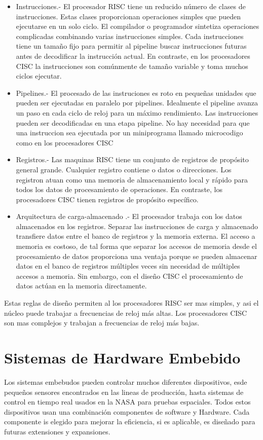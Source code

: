 \documentclass[12pt]{book}
\theoremstyle{definition}
\theoremstyle{remark}
\theoremstyle{plain}
\begin{document}
\begin{itemize}
\item Instrucciones.- El procesador RISC tiene un reducido número de clases de instrucciones. Estas clases proporcionan operaciones simples que pueden ejecutarse en un solo ciclo. El compilador o programador sintetiza operaciones complicadas combinando varias instrucciones simples. Cada instrucciones tiene un tamaño fijo para permitir al pipeline buscar instrucciones futuras antes de decodificar la instrucción actual. En contraste, en los procesadores CISC la instrucciones son comúnmente de tamaño variable y toma muchos ciclos ejecutar.
\item Pipelines.- El procesado de las instruciones es roto en pequeñas unidades que pueden ser ejecutadas en paralelo por pipelines. Idealmente el pipeline avanza un paso en cada ciclo de reloj para un máximo rendimiento. Las instrucciones pueden ser decodificadas en una etapa pipeline. No hay necesidad para que una instruccion sea ejecutada por un miniprograma llamado microcodigo como en los procesadores CISC
\item Registros.- Las maquinas RISC tiene un conjunto de registros de propósito general grande. Cualquier registro contiene o datos o direcciones. Los registron atuan como una memoria de almacenamiento local y rápido para todos los datos de procesamiento de operaciones. En contraste, los procesadores CISC tienen registros de propósito específico.
\item Arquitectura de carga-almacenado .- El procesador trabaja con los datos almacenados en los registros. Separar las instrucciones de carga y almacenado transfiere datos entre el banco de registros y la memoria externa. El acceso a memoria es costoso, de tal forma que separar los accesos de memoria desde el procesamiento de datos proporciona una ventaja porque se pueden almacenar datos en el banco de registros múltiples veces sin necesidad de múltiples accesos a memoria. Sin embargo, con el diseño CISC el procesamiento de datos actúan en la memoria directamente.
\end{itemize}

Estas reglas de diseño permiten al los procesadores RISC ser mas simples, y asi el núcleo puede trabajar a frecuencias de reloj más altas. Los procesadores CISC son mas complejos y trabajan a frecuencias de reloj más bajas.

\section{Sistemas de Hardware Embebido}
Los sistemas embebudos pueden controlar muchos diferentes dispositivos, esde pequeños sensores encontrados en las lineas de producción, hasta sistemas de control en tiempo real usados en la NASA para pruebas espaciales. Todos estos dispositivos usan una combinación componentes de software y Hardware. Cada componente is elegido para mejorar la eficiencia, si es aplicable, es diseñado para futuras extensiones y expansiones.
\end{document}
